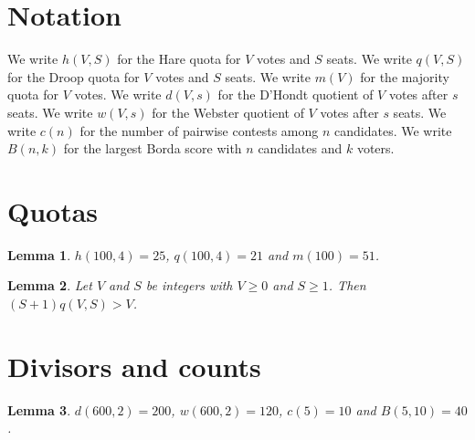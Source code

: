 \documentclass{article}
\newtheorem{lemma}{Lemma}
\begin{document}
\section{Notation}

We write $h(V,S)$ for the Hare quota for $V$ votes and $S$ seats.
We write $q(V,S)$ for the Droop quota for $V$ votes and $S$ seats.
We write $m(V)$ for the majority quota for $V$ votes.
We write $d(V,s)$ for the D'Hondt quotient of $V$ votes after $s$ seats.
We write $w(V,s)$ for the Webster quotient of $V$ votes after $s$ seats.
We write $c(n)$ for the number of pairwise contests among $n$ candidates.
We write $B(n,k)$ for the largest Borda score with $n$ candidates and $k$ voters.

\section{Quotas}

\begin{lemma}\label{quotas}
$h(100,4)=25$, $q(100,4)=21$ and $m(100)=51$.
\end{lemma}

\begin{lemma}\label{droop}
Let $V$ and $S$ be integers with $V\ge0$ and $S\ge1$. Then $(S+1)q(V,S)>V$.
\end{lemma}

\section{Divisors and counts}

\begin{lemma}\label{divisors}
$d(600,2)=200$, $w(600,2)=120$, $c(5)=10$ and $B(5,10)=40$.
\end{lemma}
\end{document}
